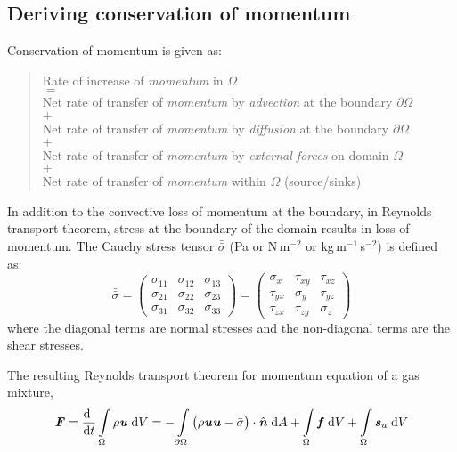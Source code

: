 \subsection{Deriving conservation of momentum}

Conservation of momentum is given as: 
\begin{quote}
	\centering
	Rate of increase of \textit{momentum} in $\Omega$\\
	$=$\\
	Net rate of transfer of \textit{momentum} by \textit{advection} at the boundary $\partial \Omega$\\
	$+$\\
	Net rate of transfer of \textit{momentum} by \textit{diffusion} at the boundary $\partial \Omega$\\
	$+$\\
	Net rate of transfer of \textit{momentum} by \textit{external forces} on domain $\Omega$\\
	$+$\\
	Net rate of transfer of \textit{momentum} within $\Omega$ (source/sinks)
\end{quote}

In addition to the convective loss of momentum at the boundary, in Reynolds transport theorem, stress at the boundary of the domain results in loss of momentum. The Cauchy stress tensor $\bar{\bar{\sigma}}$ (Pa or N\,m$^{-2}$ or kg\,m$^{-1}$\,s$^{-2}$) is defined as:
\begin{equation}
\bar{\bar{\sigma}} = \left( {\begin{array}{*{20}{c}}
	{{\sigma _{11}}}&{{\sigma _{12}}}&{{\sigma _{13}}}\\
	{{\sigma _{21}}}&{{\sigma _{22}}}&{{\sigma _{23}}}\\
	{{\sigma _{31}}}&{{\sigma _{32}}}&{{\sigma _{33}}}
	\end{array}} \right) = \left( {\begin{array}{*{20}{c}}
	{{\sigma _x}}&{{\tau _{xy}}}&{{\tau _{xz}}}\\
	{{\tau _{yx}}}&{{\sigma _y}}&{{\tau _{yz}}}\\
	{{\tau _{zx}}}&{{\tau _{zy}}}&{{\sigma _z}}
	\end{array}} \right)
\end{equation}
where the diagonal terms are normal stresses and the non-diagonal terms are the shear stresses. 

The resulting Reynolds transport theorem for momentum equation of a gas mixture, 
\begin{equation}
{\textbf{\textit{F}}} = \frac{\mathrm{d}~}{{\mathrm{d}t}} \int \limits_\Omega  {\rho }{{\textbf{\textit{u}}}}\;\mathrm{d}V =  - \int \limits_{\partial\Omega}  \left( \rho \textbf{\textit{u}}\textbf{\textit{u}} - \bar{\bar{\sigma}}\right) \cdot \hat{\textbf{\textit{n}}}\;\mathrm{d}A + \int \limits_\Omega \textbf{\textit{f}}\; \mathrm{d}V + \int \limits_\Omega \textbf{\textit{s}}_{u}\; \mathrm{d}V
\end{equation}


